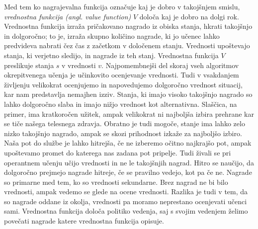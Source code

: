\documentclass[a4paper, oneside, 12pt]{report}
\begin{document}
Med tem ko nagrajevalna funkcija označuje kaj je dobro v takojšnjem smislu, {\em vrednostna funkcija (angl. value function)} $V$ določa kaj je dobro na dolgi rok. Vrednostna funkcija izraža pričakovano nagrado iz obiska stanja, hkrati takojšnjo in dolgoročno; to je, izraža skupno količino nagrade, ki jo učenec lahko predvideva nabrati čez čas z začetkom v določenem stanju. Vrednosti upoštevajo stanja, ki verjetno sledijo, in nagrade iz teh stanj. Vrednostna funkcija $V$ preslikuje stanja $s$ v vrednosti $v$. Najpomembnejši del skoraj vseh algoritmov okrepitvenega učenja je učinkovito ocenjevanje vrednosti. Tudi v vsakdanjem življenju velikokrat ocenjujemo in napovedujemo dolgoročno vrednost situacij, kar nam predstavlja nemajhen izziv. Stanja, ki imajo visoko takojšnjo nagrado so lahko dolgoročno slaba in imajo nižjo vrednost kot alternativna. Slaščica, na primer, ima kratkoročen užitek, ampak velikokrat ni najboljša izbira prehrane kar se tiče našega telesnega zdravja. Obratno je tudi mogoče, stanje ima lahko zelo nizko takojšnjo nagrado, ampak se skozi prihodnost izkaže za najboljšo izbiro. Naša pot do službe je lahko hitrejša, če ne izberemo očitno najkrajšo pot, ampak upoštevamo promet do katerega nas zadana pot pripelje. Tudi živali se pri operantnem učenju učijo vrednosti in ne le takojšnjih nagrad. Hitro se naučijo, da dolgoročno prejmejo nagrade hitreje, če se pravilno vedejo, kot pa če ne. Nagrade so primarne med tem, ko so vrednosti sekundarne. Brez nagrad ne bi bilo vrednosti, ampak vedemo se glede na ocene vrednosti. Razlika je tudi v tem, da so nagrade oddane iz okolja, vrednosti pa moramo neprestano ocenjevati učenci sami. Vrednostna funkcija določa politiko vedenja, saj s svojim vedenjem želimo povečati nagrade katere vrednostna funkcija opisuje.
\end{document}
